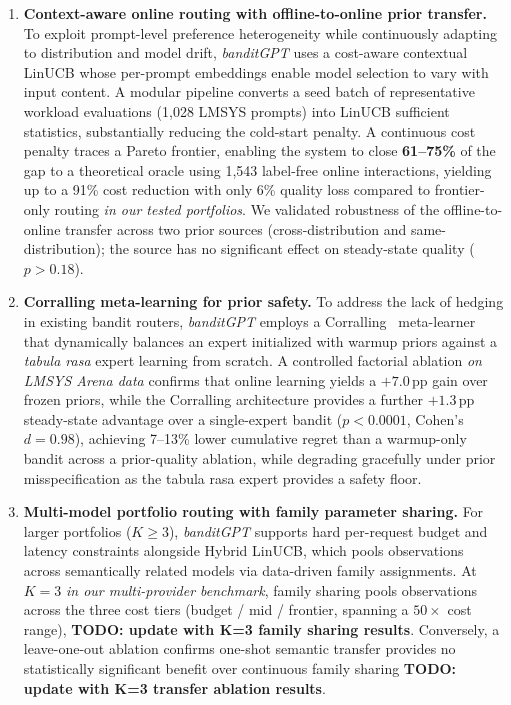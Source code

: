 \begin{enumerate}[nosep,leftmargin=*]
    \item \textbf{Context-aware online routing with offline-to-online prior transfer.} To exploit prompt-level preference heterogeneity while continuously adapting to distribution and model drift, \textit{banditGPT} uses a cost-aware contextual LinUCB whose per-prompt embeddings enable model selection to vary with input content. A modular pipeline converts a seed batch of representative workload evaluations (1{,}028 LMSYS prompts) into LinUCB sufficient statistics, substantially reducing the cold-start penalty. A continuous cost penalty traces a Pareto frontier, enabling the system to close \textbf{61--75\%} of the gap to a theoretical oracle using 1{,}543 label-free online interactions, yielding up to a 91\% cost reduction with only 6\% quality loss compared to frontier-only routing \textit{in our tested portfolios}. We validated robustness of the offline-to-online transfer across two prior sources (cross-distribution and same-distribution); the source has no significant effect on steady-state quality ($p{>}0.18$).
    
    \item \textbf{Corralling meta-learning for prior safety.} To address the lack of hedging in existing bandit routers, \textit{banditGPT} employs a Corralling~\cite{agarwal2017corralling} meta-learner that dynamically balances an expert initialized with warmup priors against a \textit{tabula rasa} expert learning from scratch. A controlled factorial ablation \textit{on LMSYS Arena data} confirms that online learning yields a $+7.0$\,pp gain over frozen priors, while the Corralling architecture provides a further $+1.3$\,pp steady-state advantage over a single-expert bandit ($p < 0.0001$, Cohen's $d{=}0.98$), achieving 7--13\% lower cumulative regret than a warmup-only bandit across a prior-quality ablation, while degrading gracefully under prior misspecification as the tabula rasa expert provides a safety floor.
    
    \item \textbf{Multi-model portfolio routing with family parameter sharing.} For larger portfolios ($K \geq 3$), \textit{banditGPT} supports hard per-request budget and latency constraints alongside Hybrid LinUCB, which pools observations across semantically related models via data-driven family assignments. At $K{=}3$ \textit{in our multi-provider benchmark}, family sharing pools observations across the three cost tiers (budget / mid / frontier, spanning a $50\times$ cost range), \textbf{TODO: update with K=3 family sharing results}. Conversely, a leave-one-out ablation confirms one-shot semantic transfer provides no statistically significant benefit over continuous family sharing \textbf{TODO: update with K=3 transfer ablation results}.
\end{enumerate}

